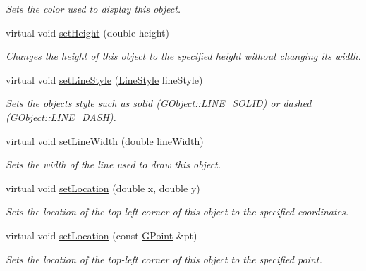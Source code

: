 \begin{DoxyCompactItemize}
\begin{DoxyCompactList}\small\item\em Sets the color used to display this object. \end{DoxyCompactList}\item 
virtual void \mbox{\hyperlink{classsgl_1_1GObject_a9e280bfc4544dfaf8e4376c4e1a74357}{set\+Height}} (double height)
\begin{DoxyCompactList}\small\item\em Changes the height of this object to the specified height without changing its width. \end{DoxyCompactList}\item 
virtual void \mbox{\hyperlink{classsgl_1_1GObject_add11575087eb94f1a71faa3f826c6341}{set\+Line\+Style}} (\mbox{\hyperlink{classsgl_1_1GObject_a86e0f5648542856159bb40775c854aa7}{Line\+Style}} line\+Style)
\begin{DoxyCompactList}\small\item\em Sets the object\textquotesingle{}s style such as solid (\mbox{\hyperlink{classsgl_1_1GObject_a86e0f5648542856159bb40775c854aa7a700c78bc2cd76acaab26651bf7b4941f}{G\+Object\+::\+L\+I\+N\+E\+\_\+\+S\+O\+L\+ID}}) or dashed (\mbox{\hyperlink{classsgl_1_1GObject_a86e0f5648542856159bb40775c854aa7a9ccba0845f785d81d07b333ae1aad84e}{G\+Object\+::\+L\+I\+N\+E\+\_\+\+D\+A\+SH}}). \end{DoxyCompactList}\item 
virtual void \mbox{\hyperlink{classsgl_1_1GObject_afd6a47c6ea6a1f85ca05a65ba3ff3477}{set\+Line\+Width}} (double line\+Width)
\begin{DoxyCompactList}\small\item\em Sets the width of the line used to draw this object. \end{DoxyCompactList}\item 
virtual void \mbox{\hyperlink{classsgl_1_1GObject_a04594e8ba9b98513a64f1da00dcae18c}{set\+Location}} (double x, double y)
\begin{DoxyCompactList}\small\item\em Sets the location of the top-\/left corner of this object to the specified coordinates. \end{DoxyCompactList}\item 
virtual void \mbox{\hyperlink{classsgl_1_1GObject_aa8480c0b7166cdf8f784cece06ab353f}{set\+Location}} (const \mbox{\hyperlink{structsgl_1_1GPoint}{G\+Point}} \&pt)
\begin{DoxyCompactList}\small\item\em Sets the location of the top-\/left corner of this object to the specified point. \end{DoxyCompactList}\item 

\end{DoxyCompactItemize}
